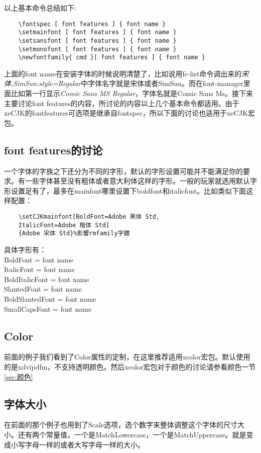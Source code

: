 \documentclass[11pt,oneside]{book}
\begin{document}
  以上基本命令总结如下:
  \begin{Verbatim}
    \fontspec [ font features ] { font name }
    \setmainfont [ font features ] { font name }
    \setsansfont [ font features ] { font name }
    \setmonofont [ font features ] { font name }
    \newfontfamily{ cmd }[ font features ] { font name }
  \end{Verbatim}

  上面的font name在安装字体的时候说明清楚了，比如说用fc-list命令调出来的\textit{宋体,SimSun:style=Regular}中字体名字就是宋体或者SimSun。而在font-manager里面比如第一行显示\textit{Comic Sans MS Regular}，字体名就是Comic Sans Ms。接下来主要讨论font features的内容，所讨论的内容以上几个基本命令都适用。由于xeCJK的fontfeatures可选项是继承自fontspec，所以下面的讨论也适用于xeCJK宏包。

  \subsection{font features的讨论}
  一个字体的字族之下还分为不同的字形，默认的字形设置可能并不能满足你的要求。有一些字体甚至没有粗体或者意大利体这样的字形。一般的玩家就选用默认字形设置足有了，最多在mainfont哪里设置下boldfont和italicfont。比如类似下面这样配置：
  \begin{Verbatim}
    \setCJKmainfont[BoldFont=Adobe 黑体 Std,
    ItalicFont=Adobe 楷体 Std]
    {Adobe 宋体 Std}%影響rmfamily字體
  \end{Verbatim}

  具体字形有：\\
  BoldFont = font name\\
  ItalicFont = font name\\
  BoldItalicFont = font name\\
  SlantedFont = font name\\
  BoldSlantedFont = font name\\
  SmallCapsFont = font name



  \subsection{Color}
  前面的例子我们看到了Color属性的定制，在这里推荐适用xcolor宏包。\XeLaTeX 默认使用的是xdvipdfm，不支持透明颜色。然后xcolor宏包对于颜色的讨论请参看颜色一节\ref{sec:颜色}

  \subsection{字体大小}
  在前面的那个例子也用到了Scale选项，选个数字来整体调整这个字体的尺寸大小。还有两个常量值，一个是MatchLowercase，一个是MatchUppercase。就是变成小写字母一样的或者大写字母一样的大小。
\end{document}
